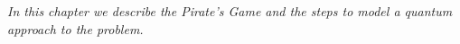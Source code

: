 
\label{cap:chapter4}

\textit{In this chapter we describe the Pirate's Game and the steps to model a quantum approach to the problem. }


%
\cleardoublepage